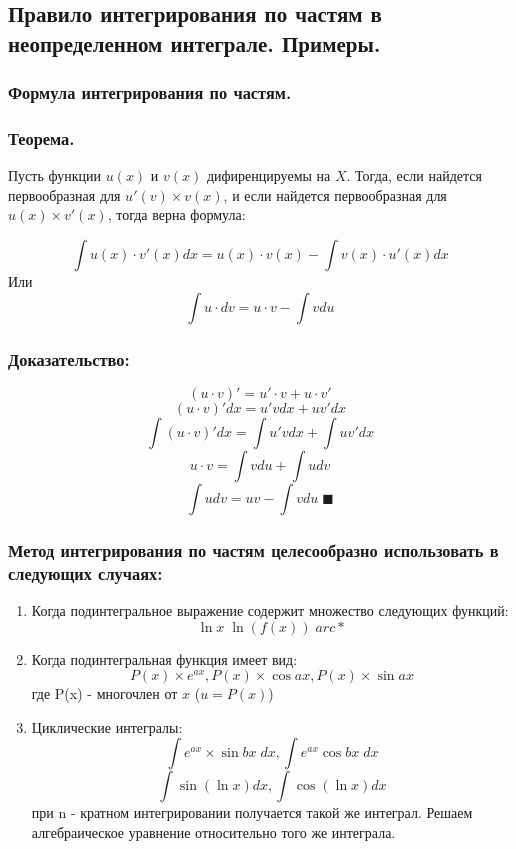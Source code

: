 \documentclass[a4paper,12pt]{article}
\theoremstyle{plain} %
\theoremstyle{definition} %
\theoremstyle{remark} %
\begin{document}
\newpage
\subsection*{Правило интегрирования по частям в неопределенном интеграле. Примеры.}

\subsubsection*{Формула интегрирования по частям.}

\subsubsection*{Теорема.}
Пусть функции $u(x)$ и $v(x)$ дифиренцируемы на $X$. Тогда, если найдется первообразная для $u'(v) \times v(x)$, и если найдется первообразная для $u(x) \times v'(x)$, тогда верна формула:

\[
	\int u(x) \cdot v'(x) dx = u(x) \cdot v(x) - \int v(x) \cdot u'(x) dx
\]
Или
\[
	\int u \cdot dv = u \cdot v - \int v du
\]

\subsubsection*{Доказательство:}
\[ (u\cdot v)' = u' \cdot v + u \cdot v' \]
\[ (u \cdot v)' dx = u' v dx + u v' dx      \]
\[ \int (u \cdot v)'dx = \int u' v dx + \int u v' dx \]
\[ u \cdot v = \int v du + \int u dv \]
\[ \int u dv = u v - \int v du \; \blacksquare\]

\subsubsection*{Метод интегрирования по частям целесообразно использовать в следующих случаях:}

\begin{enumerate}
	\item Когда подинтегральное выражение содержит множество следующих функций:
	      \[ \ln{x} \; \ln{(f(x))} \; arc* \]
	\item Когда подинтегральная функция имеет вид:
	      \[ P(x) \times e^{ax}, P(x) \times \cos{ax}, P(x) \times \sin{ax} \]
	      где P(x) - многочлен от $x$ ($u = P(x)$)
	\item Циклические интегралы:
	      \[ \int e^{ax} \times \sin{bx} \; dx, \int e^{ax} \cos{bx} \; dx \]
	      \[ \int \sin{(\ln{x})} dx, \int \cos{(\ln{x})} dx \]
	      при n - кратном интегрировании получается такой же интеграл. Решаем алгебраическое уравнение относительно того же интеграла.
\end{enumerate}
\end{document}
